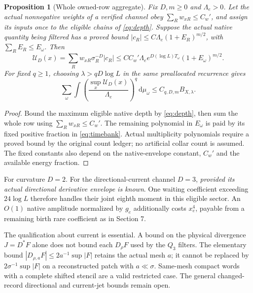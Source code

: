 \documentclass[11pt,letterpaper]{article}
\numberwithin{equation}{section}
\theoremstyle{plain}
\newtheorem{proposition}[theorem]{Proposition}
\theoremstyle{remark}\newtheorem{remark}[theorem]{Scope}
\newcommand{\dd}{\,\mathrm d}\newcommand{\eps}{\varepsilon}
\begin{document}
\begin{proposition}[Whole owned-row aggregate]
Fix $D,m\ge0$ and $\Lambda_e>0$. Let the actual nonnegative weights
of a verified channel obey
$\sum_Rw_{xR}\le C_w'$, and assign its inputs once to the eligible chains
of \eqref{eq:depth}. Suppose the actual native quantity being filtered has
a proved bound
$|c_R|\le C\Lambda_e(1+E_R)^{m/2}$, with $\sum_RE_R\le E_\omega$.
Then
\begin{equation}
 \mathcal U_D(x)=\sum_Rw_{xR}\sigma_R^{-D}|c_R|
 \le CC_w'\Lambda_e e^{D(\log L)T_\omega}(1+E_\omega)^{m/2}.
 \label{eq:aggregatesup}
\end{equation}
For fixed $q\ge1$, choosing $\lambda>qD\log L$ in the same preallocated
recurrence gives
\begin{equation}
 \sum_\omega\int
 \left(\frac{\sup_x\mathcal U_D(x)}{\Lambda_e}\right)^q
 \dd\mu_\omega\le C_{q,D,m}B_{X,\lambda}.
 \label{eq:aggregatemoment}
\end{equation}
\end{proposition}
\begin{proof}
Bound the maximum eligible native depth by \eqref{eq:depth}, then sum the
whole row using $\sum_Rw_{xR}\le C_w'$. The remaining polynomial in
$E_\omega$ is paid by its fixed positive fraction in
\eqref{eq:timebank}. Actual multiplicity polynomials require a proved
bound by the original count ledger; no artificial collar count is assumed.
The fixed constants also depend on the native-envelope constant, $C_w'$
and the available energy fraction.
\end{proof}

For curvature $D=2$. For the directional-current channel $D=3$,
\emph{provided its actual directional derivative envelope is known}.
One waiting coefficient exceeding $24\log L$ therefore handles their
joint eighth moment in this eligible sector. An $O(1)$ native amplitude
normalized by $g_e$ additionally costs $x_e^4$, payable from a remaining
birth rare coefficient as in Section 7.

The qualification about current is essential. A bound on the physical
divergence $J=D^*F$ alone does not bound each $D_\rho F$ used by the
$Q_3$ filters. The elementary bound
$|D_{\rho,a}F|\le2a^{-1}\sup|F|$ retains the actual mesh $a$; it cannot
be replaced by $2\sigma^{-1}\sup|F|$ on a reconstructed patch with
$a\ll\sigma$. Same-mesh compact words with a complete shifted stencil
are a valid restricted case. The general changed-record directional and
current-jet bounds remain open.
\end{document}
